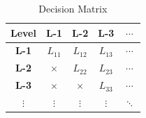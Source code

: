 
\begin{table}
\resizebox{\linewidth}{!}{%
\begin{tabular}{|c|c|c|c|c|} %
        \hline
        \textbf{Level} & \textbf{\# of $E_{useful}$} & \textbf{\# of $E_{unuseful}$} & \textbf{min key} & \textbf{max key} \\ %
        \hline
        L-0 & \-- & \-- & \-- & \-- \\ %
        \hline
        L-1 & \textit{$E_{useful\ 1}$} & \textit{$E_{unuseful\ 1}$} & $x_{1}$ & $y_{1}$ \\ %
        \hline
        L-2 & \textit{$E_{useful\ 2}$} & \textit{$E_{unuseful\ 2}$} & $x_{2}$ & $y_{2}$ \\ %
        \hline
        L-3 & \textit{$E_{useful\ 3}$} & \textit{$E_{unuseful\ 3}$} & $x_{3}$ & $y_{3}$ \\ %
        \hline
        $\vdots$ & $\vdots$ & $\vdots$ & $\vdots$ & $\vdots$ \\ %
        \hline
    \end{tabular}}
    \caption{Decision Making Data}
    \label{table:decision-making-meta-data}
\end{table}

\begin{table}
    \begin{tabular}{ |c|c|c|c|c| }
        \hline
        \textbf{Level} & \textbf{L-1} & \textbf{L-2} & \textbf{L-3} & $\cdots$ \\
        \hline
        \textbf{L-1} & $L_{11}$ & $L_{12}$ & $L_{13}$ & $\cdots$ \\
        \hline
        \textbf{L-2} & $\times$ & $L_{22}$ & $L_{23}$ & $\cdots$ \\
        \hline
        \textbf{L-3} &  $\times$ &  $\times$ & $L_{33}$ & $\cdots$ \\
        \hline
        $\vdots$ &  $\vdots$ &  $\vdots$ & $\vdots$ & $\ddots$ \\
        \hline
    \end{tabular}
    \caption{Decision Matrix }
    \label{table:decision-matrix}
\end{table}

